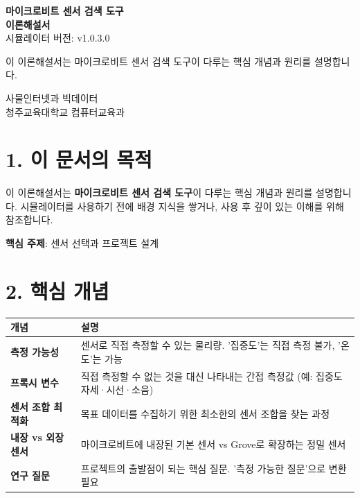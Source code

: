 \documentclass[11pt,a4paper]{article}
\begin{document}
\begin{titlepage}
\centering
\vspace*{3cm}
{\Huge\bfseries\color{primary} 마이크로비트 센서 검색 도구}\\[0.5cm]
{\Huge\bfseries\color{primary} 이론해설서}
\\[1.5cm]
{\Large 시뮬레이터 버전: v1.0.3.0}
\\[2cm]
\begin{tcolorbox}[summarybox]
\centering
{\large 이 이론해설서는 마이크로비트 센서 검색 도구이 다루는 핵심 개념과 원리를 설명합니다.}
\end{tcolorbox}
\vfill
{\large 사물인터넷과 빅데이터}\\[0.3cm]
{\large 청주교육대학교 컴퓨터교육과}
\vspace{1cm}
\end{titlepage}

\section*{1. 이 문서의 목적}

이 이론해설서는 \textbf{마이크로비트 센서 검색 도구}이 다루는 핵심 개념과 원리를 설명합니다. 시뮬레이터를 사용하기 전에 배경 지식을 쌓거나, 사용 후 깊이 있는 이해를 위해 참조합니다.


\begin{tcolorbox}[summarybox]
\textbf{핵심 주제}: 센서 선택과 프로젝트 설계

\end{tcolorbox}


\section*{2. 핵심 개념}

\begin{center}
\renewcommand{\arraystretch}{1.4}
\begin{tabular}{|p{3.1cm}|p{11.9cm}|}
\hline
\rowcolor{tableheader}
\textbf{개념} & \textbf{설명} \\
\hline
\textbf{측정 가능성} & 센서로 직접 측정할 수 있는 물리량. '집중도'는 직접 측정 불가, '온도'는 가능 \\
\hline
\textbf{프록시 변수} & 직접 측정할 수 없는 것을 대신 나타내는 간접 측정값 (예: 집중도 \textrightarrow{} 자세·시선·소음) \\
\hline
\textbf{센서 조합 최적화} & 목표 데이터를 수집하기 위한 최소한의 센서 조합을 찾는 과정 \\
\hline
\textbf{내장 vs 외장 센서} & 마이크로비트에 내장된 기본 센서 vs Grove로 확장하는 정밀 센서 \\
\hline
\textbf{연구 질문} & 프로젝트의 출발점이 되는 핵심 질문. '측정 가능한 질문'으로 변환 필요 \\
\hline
\end{tabular}
\end{center}
\end{document}
